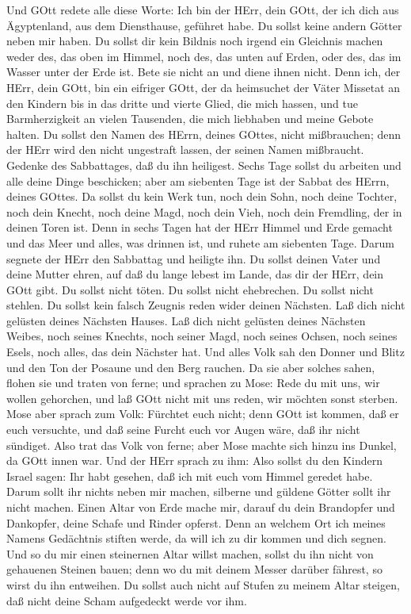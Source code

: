 Und GOtt redete alle diese Worte:  Ich bin der
HErr, dein GOtt, der ich dich aus Ägyptenland, aus dem Diensthause,
geführet habe.  Du sollst keine andern Götter neben mir
haben.  Du sollst dir kein Bildnis noch irgend ein Gleichnis
machen weder des, das oben im Himmel, noch des, das unten auf Erden,
oder des, das im Wasser unter der Erde ist.  Bete sie nicht
an und diene ihnen nicht. Denn ich, der HErr, dein GOtt, bin ein
eifriger GOtt, der da heimsuchet der Väter Missetat an den Kindern bis
in das dritte und vierte Glied, die mich hassen,  und tue
Barmherzigkeit an vielen Tausenden, die mich liebhaben und meine Gebote
halten.  Du sollst den Namen des HErrn, deines GOttes, nicht
mißbrauchen; denn der HErr wird den nicht ungestraft lassen, der seinen
Namen mißbraucht.  Gedenke des Sabbattages, daß du ihn
heiligest.  Sechs Tage sollst du arbeiten und alle deine
Dinge beschicken;  aber am siebenten Tage ist der Sabbat
des HErrn, deines GOttes. Da sollst du kein Werk tun, noch dein Sohn,
noch deine Tochter, noch dein Knecht, noch deine Magd, noch dein Vieh,
noch dein Fremdling, der in deinen Toren ist.  Denn in
sechs Tagen hat der HErr Himmel und Erde gemacht und das Meer und alles,
was drinnen ist, und ruhete am siebenten Tage. Darum segnete der HErr
den Sabbattag und heiligte ihn.  Du sollst deinen Vater und
deine Mutter ehren, auf daß du lange lebest im Lande, das dir der HErr,
dein GOtt gibt.  Du sollst nicht töten.  Du
sollst nicht ehebrechen.  Du sollst nicht stehlen.
 Du sollst kein falsch Zeugnis reden wider deinen Nächsten.
 Laß dich nicht gelüsten deines Nächsten Hauses. Laß dich
nicht gelüsten deines Nächsten Weibes, noch seines Knechts, noch seiner
Magd, noch seines Ochsen, noch seines Esels, noch alles, das dein
Nächster hat.  Und alles Volk sah den Donner und Blitz und
den Ton der Posaune und den Berg rauchen. Da sie aber solches sahen,
flohen sie und traten von ferne;  und sprachen zu Mose:
Rede du mit uns, wir wollen gehorchen, und laß GOtt nicht mit uns reden,
wir möchten sonst sterben.  Mose aber sprach zum Volk:
Fürchtet euch nicht; denn GOtt ist kommen, daß er euch versuchte, und
daß seine Furcht euch vor Augen wäre, daß ihr nicht sündiget.
 Also trat das Volk von ferne; aber Mose machte sich hinzu
ins Dunkel, da GOtt innen war.  Und der HErr sprach zu ihm:
Also sollst du den Kindern Israel sagen: Ihr habt gesehen, daß ich mit
euch vom Himmel geredet habe.  Darum sollt ihr nichts neben
mir machen, silberne und güldene Götter sollt ihr nicht machen.
 Einen Altar von Erde mache mir, darauf du dein Brandopfer
und Dankopfer, deine Schafe und Rinder opferst. Denn an welchem Ort ich
meines Namens Gedächtnis stiften werde, da will ich zu dir kommen und
dich segnen.  Und so du mir einen steinernen Altar willst
machen, sollst du ihn nicht von gehauenen Steinen bauen; denn wo du mit
deinem Messer darüber fährest, so wirst du ihn entweihen. 
Du sollst auch nicht auf Stufen zu meinem Altar steigen, daß nicht deine
Scham aufgedeckt werde vor ihm.

